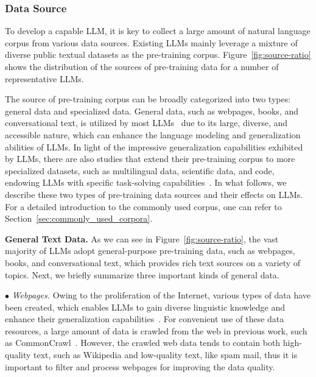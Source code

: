 \subsubsection{Data Source}\label{sec-source}
To develop a capable LLM, it is key to collect a large amount of natural language corpus from various data sources. Existing LLMs mainly leverage a mixture of diverse public textual datasets as the pre-training corpus. 
Figure~\ref{fig:source-ratio} shows  the distribution of the sources of pre-training data for a number of representative LLMs. 

The source of pre-training corpus can be broadly categorized into two types: general data and specialized data. General data, such as webpages, books, and conversational text, is utilized by most LLMs~\cite{Chowdhery-arxiv-2022-PaLM,Brown-NeurIPS-2020-Language,Zhang-arxiv-2022-OPT} due to its large, diverse, and accessible nature, which can enhance the language modeling and generalization abilities of LLMs. In light of the impressive generalization capabilities exhibited by LLMs, there are also studies that extend their pre-training corpus to more specialized datasets, such as multilingual data, scientific data, and code, endowing LLMs with specific task-solving capabilities~\cite{Chowdhery-arxiv-2022-PaLM,Taylor-arxiv-2022-Galactica, nijkamp-arxiv-2022-Codegen}. In what follows, we describe these two types of pre-training data sources and their effects on LLMs.  {For a detailed introduction to the commonly used corpus, one can refer to Section~\ref{sec:commonly_used_corpora}.} 

\textbf{General Text Data.} As we can see in Figure~\ref{fig:source-ratio}, the vast majority of LLMs adopt general-purpose pre-training data, such as webpages, books, and conversational text, which provides rich text sources on a variety of topics. Next, we briefly summarize three important kinds of general data.

$\bullet$ \emph{Webpages.} Owing to the proliferation of the Internet, various types of data have been created, which enables LLMs to gain diverse linguistic knowledge and enhance their generalization capabilities~\cite{radford-blog-2019-language,Raffel-JMLR-2020-Exploring}. For convenient use of these data resources, a large amount of data is crawled from the web in previous work, such as CommonCrawl~\cite{commoncrawl}. However, the crawled web data tends to contain both high-quality text, such as Wikipedia and low-quality text, like spam mail, thus it is important to filter and process webpages for improving the data quality. 


